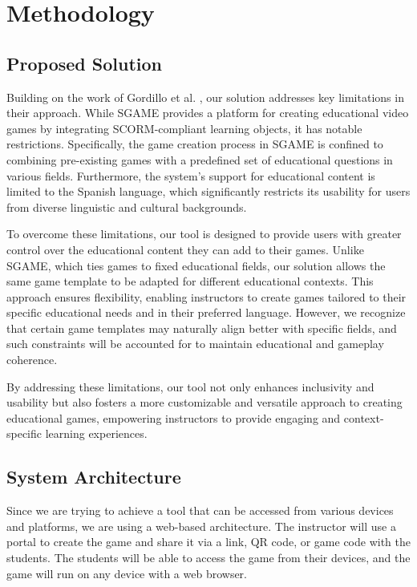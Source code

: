 \chapter{Methodology}\label{chap:method}

\section{Proposed Solution}

Building on the work of Gordillo et al. \cite{sgame2020}, our solution addresses key limitations in their approach. While SGAME provides a platform for creating educational video games by integrating SCORM-compliant learning objects, it has notable restrictions. Specifically, the game creation process in SGAME is confined to combining pre-existing games with a predefined set of educational questions in various fields. Furthermore, the system’s support for educational content is limited to the Spanish language, which significantly restricts its usability for users from diverse linguistic and cultural backgrounds.

To overcome these limitations, our tool is designed to provide users with greater control over the educational content they can add to their games. Unlike SGAME, which ties games to fixed educational fields, our solution allows the same game template to be adapted for different educational contexts. This approach ensures flexibility, enabling instructors to create games tailored to their specific educational needs and in their preferred language. However, we recognize that certain game templates may naturally align better with specific fields, and such constraints will be accounted for to maintain educational and gameplay coherence.

By addressing these limitations, our tool not only enhances inclusivity and usability but also fosters a more customizable and versatile approach to creating educational games, empowering instructors to provide engaging and context-specific learning experiences.

\section{System Architecture}
Since we are trying to achieve a tool that can be accessed from various devices and platforms, we are using a web-based architecture. The instructor will use a portal to create the game and share it via a link, QR code, or game code with the students. The students will be able to access the game from their devices, and the game will run on any device with a web browser.

